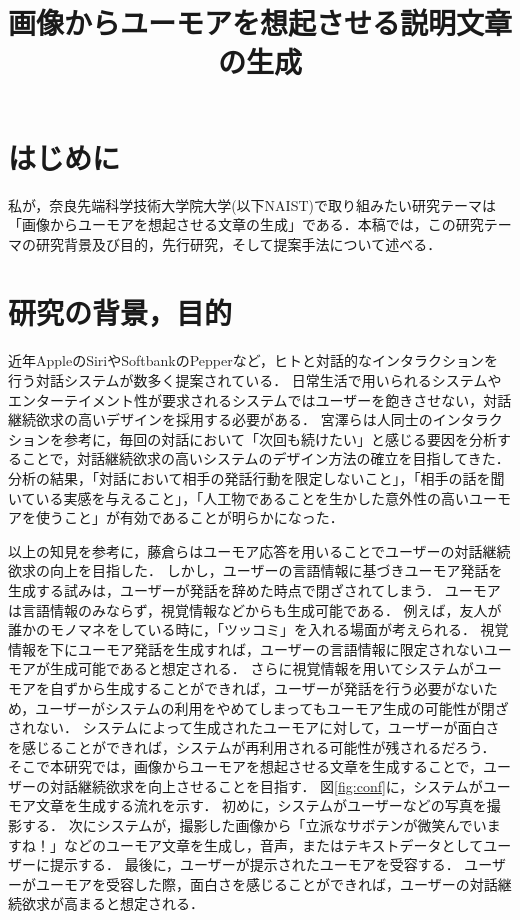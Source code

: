 \documentclass[twocolumn,2pt]{jarticle}
\title{画像からユーモアを想起させる説明文章の生成}
\date{}
\begin{document}
\small
\maketitle

\section{はじめに}
\thispagestyle{fancy}

私が，奈良先端科学技術大学院大学(以下NAIST)で取り組みたい研究テーマは「画像からユーモアを想起させる文章の生成」である．本稿では，この研究テーマの研究背景及び目的，先行研究，そして提案手法について述べる．

\section{研究の背景，目的}
近年AppleのSiriやSoftbankのPepperなど，ヒトと対話的なインタラクションを行う対話システムが数多く提案されている．
日常生活で用いられるシステムやエンターテイメント性が要求されるシステムではユーザーを飽きさせない，対話継続欲求の高いデザインを採用する必要がある．
宮澤らは人同士のインタラクションを参考に，毎回の対話において「次回も続けたい」と感じる要因を分析することで，対話継続欲求の高いシステムのデザイン方法の確立を目指してきた\cite{宮澤}．
分析の結果，「対話において相手の発話行動を限定しないこと」，「相手の話を聞いている実感を与えること」，「人工物であることを生かした意外性の高いユーモアを使うこと」が有効であることが明らかになった．



以上の知見を参考に，藤倉らはユーモア応答を用いることでユーザーの対話継続欲求の向上を目指した\cite{藤倉}．
しかし，ユーザーの言語情報に基づきユーモア発話を生成する試みは，ユーザーが発話を辞めた時点で閉ざされてしまう．
ユーモアは言語情報のみならず，視覚情報などからも生成可能である．
例えば，友人が誰かのモノマネをしている時に，「ツッコミ」を入れる場面が考えられる．
視覚情報を下にユーモア発話を生成すれば，ユーザーの言語情報に限定されないユーモアが生成可能であると想定される．
さらに視覚情報を用いてシステムがユーモアを自ずから生成することができれば，ユーザーが発話を行う必要がないため，ユーザーがシステムの利用をやめてしまってもユーモア生成の可能性が閉ざされない．
システムによって生成されたユーモアに対して，ユーザーが面白さを感じることができれば，システムが再利用される可能性が残されるだろう．
そこで本研究では，画像からユーモアを想起させる文章を生成することで，ユーザーの対話継続欲求を向上させることを目指す．
図\ref{fig:conf}に，システムがユーモア文章を生成する流れを示す．
初めに，システムがユーザーなどの写真を撮影する．
次にシステムが，撮影した画像から「立派なサボテンが微笑んでいますね！」などのユーモア文章を生成し，音声，またはテキストデータとしてユーザーに提示する．
最後に，ユーザーが提示されたユーモアを受容する．
ユーザーがユーモアを受容した際，面白さを感じることができれば，ユーザーの対話継続欲求が高まると想定される．
\end{document}

